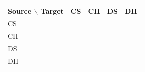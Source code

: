 \begin{tabular}{@{}lcccc@{}}
\toprule
Source $\backslash$ Target & CS & CH & DS & DH \\
\midrule
CS & \TBD{} & \TBD{} & \TBD{} & \TBD{}\\
CH & \TBD{} & \TBD{} & \TBD{} & \TBD{}\\
DS & \TBD{} & \TBD{} & \TBD{} & \TBD{}\\
DH & \TBD{} & \TBD{} & \TBD{} & \TBD{}\\
\bottomrule
\end{tabular}
